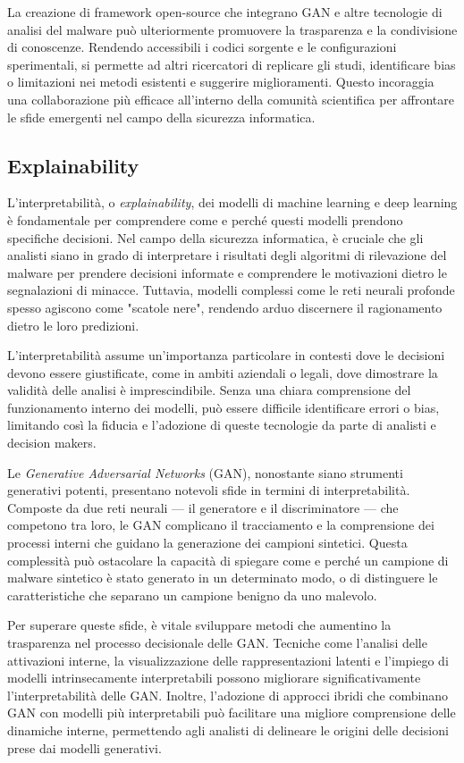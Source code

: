 La creazione di framework open-source che integrano GAN e altre tecnologie di analisi del malware può ulteriormente promuovere la trasparenza e la condivisione di conoscenze. Rendendo accessibili i codici sorgente e le configurazioni sperimentali, si permette ad altri ricercatori di replicare gli studi, identificare bias o limitazioni nei metodi esistenti e suggerire miglioramenti. Questo incoraggia una collaborazione più efficace all'interno della comunità scientifica per affrontare le sfide emergenti nel campo della sicurezza informatica.


\subsection{Explainability}

L'interpretabilità, o \emph{explainability}, dei modelli di machine learning e deep learning è fondamentale per comprendere come e perché questi modelli prendono specifiche decisioni. Nel campo della sicurezza informatica, è cruciale che gli analisti siano in grado di interpretare i risultati degli algoritmi di rilevazione del malware per prendere decisioni informate e comprendere le motivazioni dietro le segnalazioni di minacce. Tuttavia, modelli complessi come le reti neurali profonde spesso agiscono come "scatole nere", rendendo arduo discernere il ragionamento dietro le loro predizioni.

L'interpretabilità assume un'importanza particolare in contesti dove le decisioni devono essere giustificate, come in ambiti aziendali o legali, dove dimostrare la validità delle analisi è imprescindibile. Senza una chiara comprensione del funzionamento interno dei modelli, può essere difficile identificare errori o bias, limitando così la fiducia e l'adozione di queste tecnologie da parte di analisti e decision makers.

Le \emph{Generative Adversarial Networks} (GAN), nonostante siano strumenti generativi potenti, presentano notevoli sfide in termini di interpretabilità. Composte da due reti neurali — il generatore e il discriminatore — che competono tra loro, le GAN complicano il tracciamento e la comprensione dei processi interni che guidano la generazione dei campioni sintetici. Questa complessità può ostacolare la capacità di spiegare come e perché un campione di malware sintetico è stato generato in un determinato modo, o di distinguere le caratteristiche che separano un campione benigno da uno malevolo.

Per superare queste sfide, è vitale sviluppare metodi che aumentino la trasparenza nel processo decisionale delle GAN. Tecniche come l'analisi delle attivazioni interne, la visualizzazione delle rappresentazioni latenti e l'impiego di modelli intrinsecamente interpretabili possono migliorare significativamente l'interpretabilità delle GAN. Inoltre, l'adozione di approcci ibridi che combinano GAN con modelli più interpretabili può facilitare una migliore comprensione delle dinamiche interne, permettendo agli analisti di delineare le origini delle decisioni prese dai modelli generativi.

